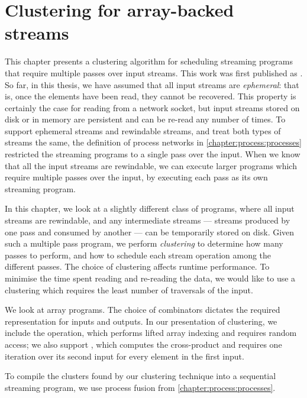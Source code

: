 \chapter{Clustering for array-backed streams}
\label{clustering}




This chapter presents a clustering algorithm for scheduling streaming programs that require multiple passes over input streams.
This work was first published as \citet{robinson2014fusing}.
So far, in this thesis, we have assumed that all input streams are \emph{ephemeral}: that is, once the elements have been read, they cannot be recovered.
This property is certainly the case for reading from a network socket, but input streams stored on disk or in memory are persistent and can be re-read any number of times.
To support ephemeral streams and rewindable streams, and treat both types of streams the same, the definition of process networks in \cref{chapter:process:processes} restricted the streaming programs to a single pass over the input.
When we know that all the input streams are rewindable, we can execute larger programs which require multiple passes over the input, by executing each pass as its own streaming program.

In this chapter, we look at a slightly different class of programs, where all input streams are rewindable, and any intermediate streams --- streams produced by one pass and consumed by another --- can be temporarily stored on disk.
Given such a multiple pass program, we perform \emph{clustering} to determine how many passes to perform, and how to schedule each stream operation among the different passes.
The choice of clustering affects runtime performance.
To minimise the time spent reading and re-reading the data, we would like to use a clustering which requires the least number of traversals of the input.

We look at array programs.
The choice of combinators dictates the required representation for inputs and outputs.
In our presentation of clustering, we include the \Hs@gather@ operation, which performs lifted array indexing and requires random access; we also support \Hs@cross@, which computes the cross-product and requires one iteration over its second input for every element in the first input.

To compile the clusters found by our clustering technique into a sequential streaming program, we use process fusion from \cref{chapter:process:processes}.

